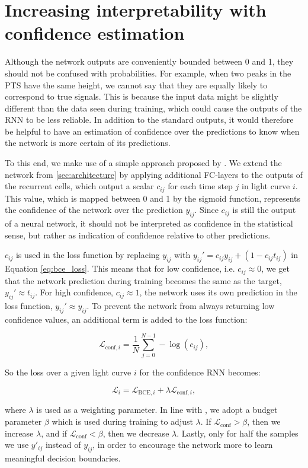 
\section{Increasing interpretability with confidence estimation}
\label{sec:rnn_conf}

Although the network outputs are conveniently bounded between 0 and 1, they should not be confused with probabilities. For example, when two peaks in the PTS have the same height, we cannot say that they are equally likely to correspond to true signals. This is because the input data might be slightly different than the data seen during training, which could cause the outputs of the RNN to be less reliable. In addition to the standard outputs, it would therefore be helpful to have an estimation of confidence over the predictions to know when the network is more certain of its predictions.

To this end, we make use of a simple approach proposed by \cite{devries2018learning}. We extend the network from \ref{sec:architecture} by applying additional FC-layers to the outputs of the recurrent cells, which output a scalar $c_{ij}$ for each time step $j$ in light curve $i$. This value, which is mapped between 0 and 1 by the sigmoid function, represents the confidence of the network over the prediction $y_{ij}$. Since $c_{ij}$ is still the output of a neural network, it should not be interpreted as confidence in the statistical sense, but rather as indication of confidence relative to other predictions. 

$c_{ij}$ is used in the loss function by replacing $y_{ij}$ with $y_{ij}' = c_{ij} y_{ij} +  (1-c_{ij} t_{ij})$ in Equation \ref{eq:bce_loss}. This means that for low confidence, i.e. $c_{ij} \approx 0$, we get that the network prediction during training becomes the same as the target, $y_{ij}' \approx t_{ij}$. For high confidence, $c_{ij} \approx 1$, the network uses its own prediction in the loss function, $y_{ij}' \approx y_{ij}$. To prevent the network from always returning low confidence values, an additional term is added to the loss function: 

\begin{equation}
    \mathcal{L}_{\text{conf},i} = 
    \frac{1}{N}\sum^{N-1}_{j=0} -\log(c_{ij}),
\end{equation}

\noindent So the loss over a given light curve $i$ for the confidence RNN becomes:

\begin{equation}
    \mathcal{L}_i = \mathcal{L}_{\text{BCE},i} + \lambda \mathcal{L}_{\text{conf},i},
\end{equation}

\noindent where $\lambda$ is used as a weighting parameter. In line with \cite{devries2018learning}, we adopt a budget parameter $\beta$ which is used during training to adjust $\lambda$. If $\mathcal{L}_{\text{conf}} > \beta$, then we increase $\lambda$, and if $\mathcal{L}_{\text{conf}} < \beta$, then we decrease $\lambda$. Lastly, only for half the samples we use $y'_{ij}$ instead of $y_{ij}$, in order to encourage the network more to learn meaningful decision boundaries. 